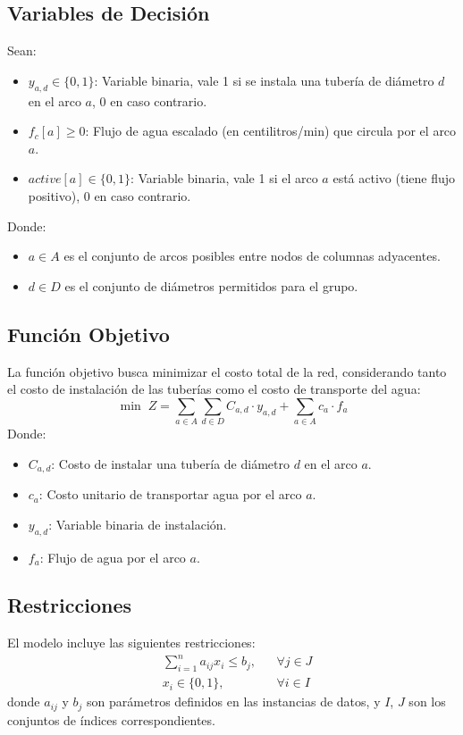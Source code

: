 \documentclass[a4paper,12pt]{article}
\begin{document}
\subsection{Variables de Decisión}
Sean:
\begin{itemize}
    \item $y_{a,d} \in \{0,1\}$: Variable binaria, vale 1 si se instala una tubería de diámetro $d$ en el arco $a$, 0 en caso contrario.
    \item $f_c[a] \geq 0$: Flujo de agua escalado (en centilitros/min) que circula por el arco $a$.
    \item $active[a] \in \{0,1\}$: Variable binaria, vale 1 si el arco $a$ está activo (tiene flujo positivo), 0 en caso contrario.
\end{itemize}
Donde:
\begin{itemize}
    \item $a \in A$ es el conjunto de arcos posibles entre nodos de columnas adyacentes.
    \item $d \in D$ es el conjunto de diámetros permitidos para el grupo.
\end{itemize}

\subsection{Función Objetivo}
La función objetivo busca minimizar el costo total de la red, considerando tanto el costo de instalación de las tuberías como el costo de transporte del agua:
\begin{equation}
    \min \; Z = \sum_{a \in A} \sum_{d \in D} C_{a,d} \cdot y_{a,d} + \sum_{a \in A} c_a \cdot f_a
\end{equation}
Donde:
\begin{itemize}
    \item $C_{a,d}$: Costo de instalar una tubería de diámetro $d$ en el arco $a$.
    \item $c_a$: Costo unitario de transportar agua por el arco $a$.
    \item $y_{a,d}$: Variable binaria de instalación.
    \item $f_a$: Flujo de agua por el arco $a$.
\end{itemize}

\subsection{Restricciones}
El modelo incluye las siguientes restricciones:
\begin{align}
    &\sum_{i=1}^{n} a_{ij} x_i \leq b_j, && \forall j \in J \\
    &x_i \in \{0,1\}, && \forall i \in I
\end{align}
donde $a_{ij}$ y $b_j$ son parámetros definidos en las instancias de datos, y $I$, $J$ son los conjuntos de índices correspondientes.
\end{document}
